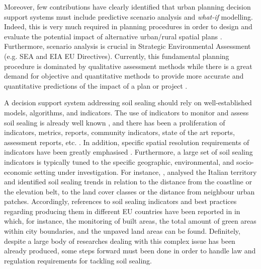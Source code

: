 \documentclass[APA,LATO1COL,doublespace]{WileyNJD-v2}
\begin{document}
Moreover, few contributions have clearly identified that urban planning decision support systems must include predictive scenario analysis \citep{Choi16,Xiang03,Volk10} and \textit{what-if} modelling. 
Indeed, this is very much required in planning procedures in order to design and evaluate the potential impact of alternative urban/rural spatial plans \citep{Hawkins02,Harms95,Choi16,vonHaaren06}. 
Furthermore, scenario analysis is crucial in Strategic Environmental Assessment (e.g. SEA and EIA EU Directives). Currently, this fundamental planning procedure is dominated by qualitative assessment methods while there is a great demand for objective and quantitative methods \citep{Choi16} to provide more accurate and quantitative predictions of the impact of a plan or project \citep{Carver03,Vanderhaegen05}.

A decision support system addressing soil sealing should rely on well-established models, algorithms, and indicators. The use of indicators to monitor and assess soil sealing is already well known \citep{King16}, and there has been a proliferation of indicators, metrics, reports, community indicators, state of the art reports, assessment reports, etc. \citep{Maclaren96,Tanguay10}.
In addition, specific spatial resolution requirements of indicators have been greatly emphasised \citep{Jaeger08}.
Furthermore, a large set of soil sealing indicators is typically tuned to the specific geographic, environmental, and socio-economic setting under investigation.
For instance, \citet{Munafo13}, analysed the Italian territory and identified soil sealing trends in relation to the distance from the coastline or the elevation belt, to the land cover classes or the distance from neighbour urban patches.
Accordingly, references to soil sealing indicators and best practices regarding producing them in different EU countries have been reported in \citep{EC2011b} in which, for instance, the monitoring of built areas, the total amount of green areas within city boundaries, and the unpaved land areas can be found.
Definitely, despite a large body of researches dealing with this complex issue has been already produced, some steps forward must been done in order to handle law and regulation requirements for tackling soil sealing.
\end{document}
